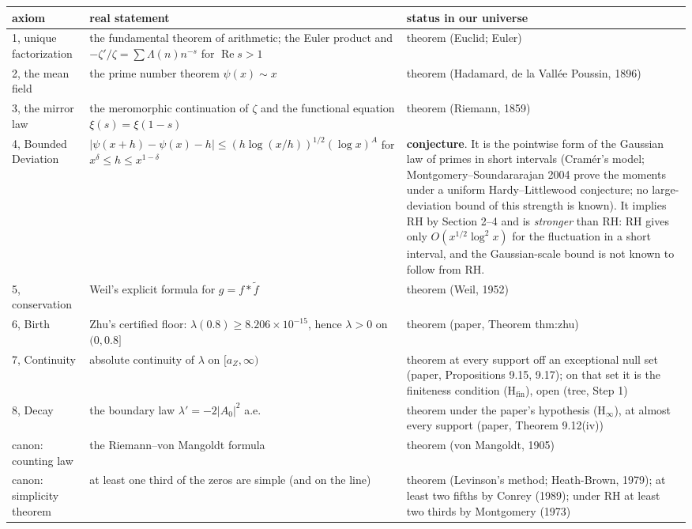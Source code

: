 \documentclass[11pt]{article}
\theoremstyle{definition}
\theoremstyle{remark}
\newcommand{\Ree}{\operatorname{Re}}
\newcommand{\ps}{\psi}
\begin{document}
\begin{center}\small
\begin{tabular}{@{}p{3.6cm}p{6.2cm}p{5.4cm}@{}}
\toprule
axiom & real statement & status in our universe\\
\midrule
1, unique factorization & the fundamental theorem of arithmetic; the Euler product and $-\zeta'/\zeta=\sum\Lambda(n)n^{-s}$ for $\Ree s>1$ & theorem (Euclid; Euler)\\
2, the mean field & the prime number theorem $\ps(x)\sim x$ & theorem (Hadamard, de la Vall\'ee Poussin, 1896)\\
3, the mirror law & the meromorphic continuation of $\zeta$ and the functional equation $\xi(s)=\xi(1-s)$ & theorem (Riemann, 1859)\\
4, Bounded Deviation & $|\ps(x+h)-\ps(x)-h|\le(h\log(x/h))^{1/2}(\log x)^A$ for $x^\delta\le h\le x^{1-\delta}$ & \textbf{conjecture}. It is the pointwise form of the Gaussian law of primes in short intervals (Cram\'er's model; Montgomery--Soundararajan 2004 prove the moments under a uniform Hardy--Littlewood conjecture; no large-deviation bound of this strength is known). It implies RH by Section 2--4 and is \emph{stronger} than RH: RH gives only $O(x^{1/2}\log^2x)$ for the fluctuation in a short interval, and the Gaussian-scale bound is not known to follow from RH.\\
5, conservation & Weil's explicit formula for $g=f*\tilde f$ & theorem (Weil, 1952)\\
6, Birth & Zhu's certified floor: $\lambda(0.8)\ge8.206\times10^{-15}$, hence $\lambda>0$ on $(0,0.8]$ & theorem (paper, Theorem thm:zhu)\\
7, Continuity & absolute continuity of $\lambda$ on $[a_Z,\infty)$ & theorem at every support off an exceptional null set (paper, Propositions 9.15, 9.17); on that set it is the finiteness condition (H$_{\mathrm{fin}}$), open (tree, Step 1)\\
8, Decay & the boundary law $\lambda'=-2|A_0|^2$ a.e. & theorem under the paper's hypothesis (H$_\infty$), at almost every support (paper, Theorem 9.12(iv))\\
canon: counting law & the Riemann--von Mangoldt formula & theorem (von Mangoldt, 1905)\\
canon: simplicity theorem & at least one third of the zeros are simple (and on the line) & theorem (Levinson's method; Heath-Brown, 1979); at least two fifths by Conrey (1989); under RH at least two thirds by Montgomery (1973)\\
\bottomrule
\end{tabular}
\end{center}
\end{document}

